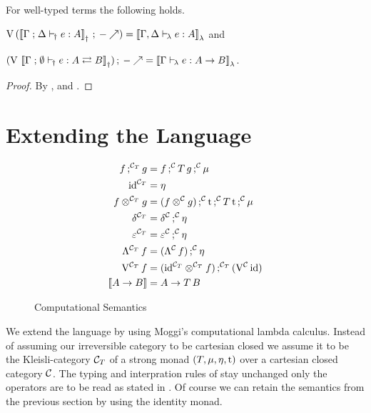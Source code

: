 \documentclass[runningheads,envcountsame]{llncs}
\begin{document}
    \begin{theorem}
        For well-typed terms the following holds. \label{thm:forward-equals-fun}
        \begin{theoremlist}
        \item $\uncurry\,(\comp{\semD{\typeruled{\Gamma}{\Delta}{e}{\js}{A}}}{\f{-}}) = \semL{\typerulel{\Gamma, \Delta}{e}{A}}$ and
        \item $\comp{(\uncurry\,\semD{\typeruled{\Gamma}{\emptyset}{e}{\fun}{\tjs{A}{B}}})}{\f{-}} = \semL{\typerulel{\Gamma}{e}{\tfun{A}{B}}}$.
        \end{theoremlist}
    \end{theorem}
    \begin{proof}
        By ,  and .
    \end{proof}
    
    \section{Extending the Language}
    
    \begin{figure}
        \centering
        \begin{align*}
            \comp[\C_T]{f}{g} &= \comp[\C]{\comp[\C]{f}{T\,g}}{\mu} \\
            \id[\C_T] &= \munit \\
            \tensor[\C_T]{f}{g} &= \comp[\C]{\comp[\C]{\comp[\C]{(\tensor[\C]{f}{g})}{\mstrength}}{T\,\mstrength}}{\mjoin} \\
            \dup[\C_T] &= \comp[\C]{\dup[\C]}{\munit} \\
            \terminal[\C_T] &= \comp[\C]{\terminal[\C]}{\munit} \\
            \curry[\C_T]\,f &= \comp[\C]{(\curry[\C]\,f)}{\munit} \\
            \uncurry[\C_T]\,f &= \comp[\C_T]{(\tensor[\C_T]{\id[\C_T]}{f})}{(\uncurry[\C]\,\id)} \\
            \sem{\tfun{A}{B}} &= A \to T\,B
        \end{align*}
        \caption{Computational Semantics}
        \label{fig:computational-semantics}
    \end{figure}
    
    We extend the language by using Moggi's computational lambda calculus. Instead of assuming our irreversible category to be cartesian closed we assume it to be the Kleisli-category $\mathcal{C}_T$ of a strong monad $(T, \mjoin, \munit, \mstrength)$ over a cartesian closed category $\mathcal{C}$. The typing and interpration rules of  stay unchanged only the operators are to be read as stated in . Of course we can retain the semantics from the previous section by using the identity monad.
    
\end{document}
